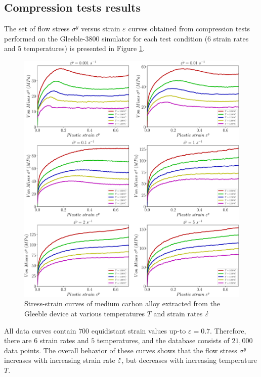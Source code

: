 \documentclass[metals,article,submit,pdftex,moreauthors]{Definitions/mdpi}
\DeclareRobustCommand{\mdot}[1]{\accentset{\mbox{\bfseries .}}{#1}}
\begin{document}
\subsection{Compression tests results\label{sec:ComTestResults}}

The set of flow stress $\sigma^y$ versus strain $\varepsilon$ curves obtained from compression tests performed on the Gleeble-3800 simulator for each test condition (6 strain rates and 5 temperatures) is presented in Figure \ref{fig:RawData}.
\begin{figure}[!ht]
\centering
\includegraphics[width=\columnwidth]{Figures/rawData}
\caption{Stress-strain curves of medium carbon alloy extracted from the Gleeble device at various temperatures $T$ and strain rates $\mdot\varepsilon$}
\label{fig:RawData}
\end{figure}
All data curves contain $700$ equidistant strain values up-to $\varepsilon=0.7$.
Therefore, there are $6$ strain rates and $5$ temperatures, and the database consists of $21,000$ data points.
The overall behavior of these curves shows that the flow stress $\sigma^y$ increases with increasing strain rate $\mdot\varepsilon$, but decreases with increasing temperature $T$.
\end{document}
